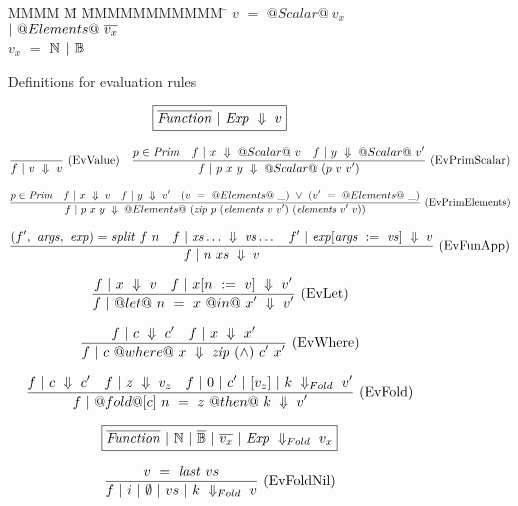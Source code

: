 
\begin{figure}
\begin{tabbing}
MMMM \= M \= MMMMMMMMMMM \= \kill
$v$  \> $=$ \> $@Scalar@~v_x$ \> $|~ @Elements@~\overline{v_x}$ \\
$v_x$\> $=$ \> $\mathbb{N}$ \> $|~ \mathbb{B}$ \\
\end{tabbing}

\caption{Definitions for evaluation rules}
\label{fig:source:eval}
\end{figure}

\begin{figure*}

$$
\boxed{\overline{\mathit{Function}} ~|~ \mathit{Exp} ~\Downarrow~ v}
$$

$$
\frac {\displaystyle 
} {\displaystyle 
    f ~|~ v ~\Downarrow~ v
} \ 
\textrm{(EvValue)}
\quad
\frac {\displaystyle 
    p \in \mathit{Prim}
    \quad
    f ~|~ x ~\Downarrow~ @Scalar@~v
    \quad
    f ~|~ y ~\Downarrow~ @Scalar@~v'
} {\displaystyle 
    f ~|~ p~x~y ~\Downarrow~ @Scalar@~(p~v~v')
} \ 
\textrm{(EvPrimScalar)}
$$

$$
\frac {\displaystyle 
    p \in \mathit{Prim}
    \quad
    f ~|~ x ~\Downarrow~ v
    \quad
    f ~|~ y ~\Downarrow~ v'
    \quad
    (v~=~@Elements@~\_)~\vee~(v'~=~@Elements@~\_)
} {\displaystyle 
    f ~|~ p~x~y ~\Downarrow~ @Elements@~(\mathit{zip}~p~(\mathit{elements}~v~v')~(\mathit{elements}~v'~v))
} \ 
\textrm{(EvPrimElements)}
$$

$$
\frac {\displaystyle 
    (f',~\mathit{args},~\mathit{exp}) = \mathit{split}~f~n
    \quad
    f ~|~ \mathit{xs}\ldots ~\Downarrow~ \mathit{vs}\ldots
    \quad
    f' ~|~ \mathit{exp}[\mathit{args}~:=~\mathit{vs}] ~\Downarrow~ v
} {\displaystyle 
    f ~|~ n~xs ~\Downarrow~ v
} \ 
\textrm{(EvFunApp)}
$$

$$
\frac {\displaystyle 
    f ~|~ x ~\Downarrow~ v
    \quad
    f ~|~ x[n~:=~v] ~\Downarrow~ v'
} {\displaystyle 
    f ~|~ @let@~n~=~x~@in@~x' ~\Downarrow~ v'
} \ 
\textrm{(EvLet)}
$$

$$
\frac {\displaystyle 
    f ~|~ c ~\Downarrow~ c'
    \quad
    f ~|~ x ~\Downarrow~ x'
} {\displaystyle 
    f ~|~ c~@where@~x ~\Downarrow~ \mathit{zip}~(\wedge)~c'~x'
} \ 
\textrm{(EvWhere)}
$$

$$
\frac {\displaystyle 
    f ~|~ c ~\Downarrow~ c'
    \quad
    f ~|~ z ~\Downarrow~ v_z
    \quad
    f~|~0~|~c'~|~[v_z]~|~k~\Downarrow_{Fold}~v'
} {\displaystyle 
    f ~|~ @fold@[c]~n~=~z~@then@~k ~\Downarrow~ v'
} \ 
\textrm{(EvFold)}
$$

$$
\boxed{\overline{\mathit{Function}}~|~\mathbb{N}~|~\overline{\mathbb{B}}~|~\overline{v_x}~|~\mathit{Exp}~\Downarrow_{Fold}~v_x}
$$

$$
\frac {\displaystyle 
    v~=~\mathit{last}~vs
} {\displaystyle 
    f~|~i~|~\emptyset~|~vs~|~k~\Downarrow_{Fold}~v
} \ 
\textrm{(EvFoldNil)}
$$


\end{figure*}
